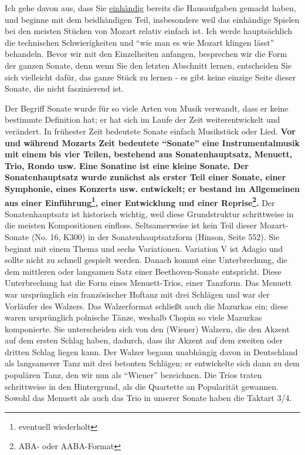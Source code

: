 Ich gehe davon aus, dass Sie \hyperlink{c1ii7}{einhändig} bereits die Hausaufgaben gemacht haben, und beginne mit dem beidhändigen Teil, insbesondere weil das einhändige Spielen bei den meisten Stücken von Mozart relativ einfach ist.
Ich werde hauptsächlich die technischen Schwierigkeiten und \enquote{wie man es wie Mozart klingen lässt} behandeln.
Bevor wir mit den Einzelheiten anfangen, besprechen wir die Form der ganzen Sonate, denn wenn Sie den letzten Abschnitt lernen, entscheiden Sie sich vielleicht dafür, das ganze Stück zu lernen - es gibt keine einzige Seite dieser Sonate, die nicht faszinierend ist.

Der Begriff Sonate wurde für so viele Arten von Musik verwandt, dass er keine bestimmte Definition hat; er hat sich im Laufe der Zeit weiterentwickelt und verändert.
In frühester Zeit bedeutete Sonate einfach Musikstück oder Lied.
\textbf{Vor und während Mozarts Zeit bedeutete \enquote{Sonate} eine Instrumentalmusik mit einem bis vier Teilen, bestehend aus Sonatenhauptsatz, Menuett, Trio, Rondo usw.
Eine Sonatine ist eine kleine Sonate.
Der Sonatenhauptsatz wurde zunächst als erster Teil einer Sonate, einer Symphonie, eines Konzerts usw. entwickelt; er bestand im Allgemeinen aus einer Einführung\footnote{eventuell wiederholt}, einer Entwicklung und einer Reprise\footnote{ABA- oder AABA-Format}.}
Der Sonatenhauptsatz ist historisch wichtig, weil diese Grundstruktur schrittweise in die meisten Kompositionen einfloss. 
Seltsamerweise ist kein Teil dieser Mozart-Sonate (No. 16, K300) in der Sonatenhauptsatzform (Hinson, Seite 552).
Sie beginnt mit einem Thema und sechs Variationen.
Variation V ist Adagio und sollte nicht zu schnell gespielt werden.
Danach kommt eine Unterbrechung, die dem mittleren oder langsamen Satz einer Beethoven-Sonate entspricht.
Diese Unterbrechung hat die Form eines Menuett-Trios, einer Tanzform.
Das Menuett war ursprünglich ein französischer Hoftanz mit drei Schlägen und war der Vorläufer des Walzers.
Das Walzerformat schließt auch die Mazurkas ein; diese waren ursprünglich polnische Tänze, weshalb Chopin so viele Mazurkas komponierte.
Sie unterscheiden sich von den (Wiener) Walzern, die den Akzent auf dem ersten Schlag haben, dadurch, dass ihr Akzent auf dem zweiten oder dritten Schlag liegen kann.
Der Walzer begann unabhängig davon in Deutschland als langsamerer Tanz mit drei betonten Schlägen; er entwickelte sich dann zu dem populären Tanz, den wir nun als \enquote{Wiener} bezeichnen.
Die Trios traten schrittweise in den Hintergrund, als die Quartette an Popularität gewannen.
Sowohl das Menuett als auch das Trio in unserer Sonate haben die Taktart 3/4.
